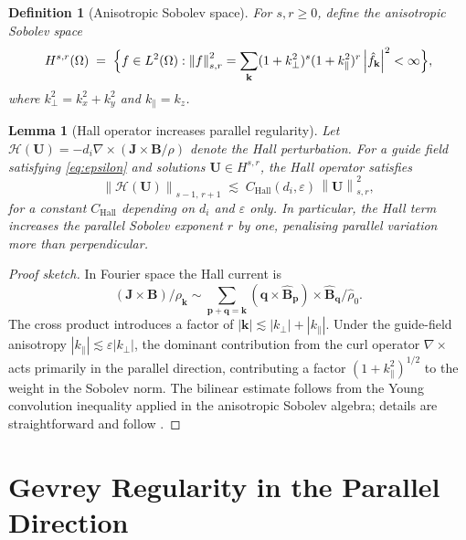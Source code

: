 \documentclass[12pt, a4paper]{article}
\newtheorem{lemma}[theorem]{Lemma}
\newtheorem{definition}[theorem]{Definition}
\newcommand{\norm}[1]{\left\lVert #1 \right\rVert}
\newcommand{\abs}[1]{\left| #1 \right|}
\newcommand{\di}{d_i}
\newcommand{\eps}{\varepsilon}
\newcommand{\kpar}{k_\parallel}
\newcommand{\Hs}[2]{H^{#1,#2}}
\begin{document}
\begin{definition}[Anisotropic Sobolev space]
\label{def:aniso-sobolev}
For $s, r \geq 0$, define the anisotropic Sobolev space
\[
  \Hs{s}{r}(\Omega) \;=\;
  \Bigl\{
    f \in L^2(\Omega) :
    \norm{f}_{s,r}^2
    = \sum_{\mathbf{k}} (1+k_\perp^2)^s (1+\kpar^2)^r \abs{\hat{f}_\mathbf{k}}^2
    < \infty
  \Bigr\},
\]
where $k_\perp^2 = k_x^2 + k_y^2$ and $\kpar = k_z$.
\end{definition}

\begin{lemma}[Hall operator increases parallel regularity]
\label{lem:hall-sobolev}
Let $\mathcal{H}(\mathbf{U}) = -\di \nabla \times (\mathbf{J} \times \mathbf{B}/\rho)$
denote the Hall perturbation.  For a guide field satisfying
\cref{eq:epsilon} and solutions $\mathbf{U} \in \Hs{s}{r}$, the Hall
operator satisfies
\[
  \norm{\mathcal{H}(\mathbf{U})}_{s-1,\, r+1}
  \;\lesssim\;
  C_\mathrm{Hall}(\di,\eps)\,\norm{\mathbf{U}}_{s,r}^2,
\]
for a constant $C_\mathrm{Hall}$ depending on $\di$ and $\eps$ only.
In particular, the Hall term \emph{increases} the parallel Sobolev
exponent $r$ by one, penalising parallel variation more than perpendicular.
\end{lemma}

\begin{proof}[Proof sketch]
In Fourier space the Hall current is
\[
  \widehat{(\mathbf{J}\times\mathbf{B})/\rho}_\mathbf{k}
  \sim
  \sum_{\mathbf{p}+\mathbf{q}=\mathbf{k}}
  (\mathbf{q}\times\hat{\mathbf{B}}_\mathbf{p}) \times \hat{\mathbf{B}}_\mathbf{q}/\hat\rho_0.
\]
The cross product introduces a factor of $\abs{\mathbf{k}} \lesssim
\abs{k_\perp} + \abs{\kpar}$.  Under the guide-field anisotropy
$\abs{\kpar} \lesssim \eps \abs{k_\perp}$, the dominant contribution from
the curl operator $\nabla\times$ acts primarily in the parallel direction,
contributing a factor $(1+\kpar^2)^{1/2}$ to the weight in the Sobolev
norm.  The bilinear estimate follows from the Young convolution inequality
applied in the anisotropic Sobolev algebra; details are straightforward
and follow \cite{Constantin1988}.
\end{proof}

\section{Gevrey Regularity in the Parallel Direction}
\label{sec:gevrey}
\end{document}
